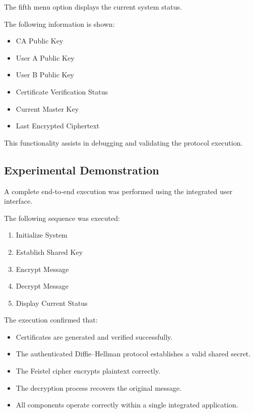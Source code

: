 \documentclass[12pt]{article}
\begin{document}
The fifth menu option displays the current system status.

The following information is shown:

\begin{itemize}
\item CA Public Key
\item User A Public Key
\item User B Public Key
\item Certificate Verification Status
\item Current Master Key
\item Last Encrypted Ciphertext
\end{itemize}

This functionality assists in debugging and validating the protocol execution.

\subsection{Experimental Demonstration}

A complete end-to-end execution was performed using the integrated user interface.

The following sequence was executed:

\begin{enumerate}
\item Initialize System
\item Establish Shared Key
\item Encrypt Message
\item Decrypt Message
\item Display Current Status
\end{enumerate}

The execution confirmed that:

\begin{itemize}
\item Certificates are generated and verified successfully.
\item The authenticated Diffie--Hellman protocol establishes a valid shared secret.
\item The Feistel cipher encrypts plaintext correctly.
\item The decryption process recovers the original message.
\item All components operate correctly within a single integrated application.
\end{itemize}
\end{document}
